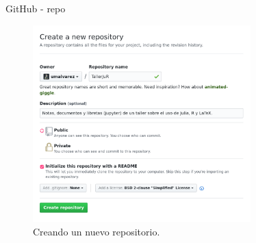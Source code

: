 \documentclass{beamer}
\begin{document}
\begin{frame}{GitHub - repo}
  \begin{figure}[hp]
    \centering \includegraphics[width=0.75\textwidth]{fig/01newRepo}
    \caption{Creando un nuevo repositorio.}
    \label{fig:githNr}
  \end{figure}
\end{frame}




\end{document}
